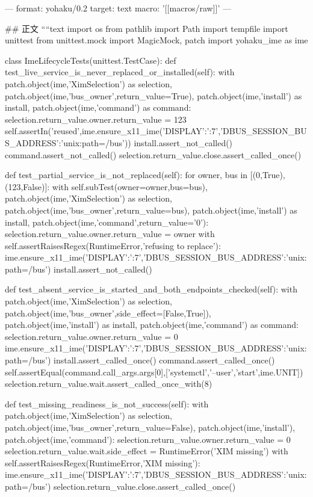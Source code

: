 ---
format: yohaku/0.2
target: text
macro: '[[macros/raw]]'
---

## 正文
````text
import os
from pathlib import Path
import tempfile
import unittest
from unittest.mock import MagicMock, patch
import yohaku_ime as ime


class ImeLifecycleTests(unittest.TestCase):
    def test_live_service_is_never_replaced_or_installed(self):
        with patch.object(ime,'XimSelection') as selection, patch.object(ime,'bus_owner',return_value=True), patch.object(ime,'install') as install, patch.object(ime,'command') as command:
            selection.return_value.owner.return_value = 123
            self.assertIn('reused',ime.ensure_x11_ime({'DISPLAY':':7','DBUS_SESSION_BUS_ADDRESS':'unix:path=/bus'}))
            install.assert_not_called()
            command.assert_not_called()
            selection.return_value.close.assert_called_once()

    def test_partial_service_is_not_replaced(self):
        for owner, bus in [(0,True),(123,False)]:
            with self.subTest(owner=owner,bus=bus), patch.object(ime,'XimSelection') as selection, patch.object(ime,'bus_owner',return_value=bus), patch.object(ime,'install') as install, patch.object(ime,'command',return_value='0'):
                selection.return_value.owner.return_value = owner
                with self.assertRaisesRegex(RuntimeError,'refusing to replace'):
                    ime.ensure_x11_ime({'DISPLAY':':7','DBUS_SESSION_BUS_ADDRESS':'unix:path=/bus'})
                install.assert_not_called()

    def test_absent_service_is_started_and_both_endpoints_checked(self):
        with patch.object(ime,'XimSelection') as selection, patch.object(ime,'bus_owner',side_effect=[False,True]), patch.object(ime,'install') as install, patch.object(ime,'command') as command:
            selection.return_value.owner.return_value = 0
            ime.ensure_x11_ime({'DISPLAY':':7','DBUS_SESSION_BUS_ADDRESS':'unix:path=/bus'})
            install.assert_called_once()
            command.assert_called_once()
            self.assertEqual(command.call_args.args[0],['systemctl','--user','start',ime.UNIT])
            selection.return_value.wait.assert_called_once_with(8)

    def test_missing_readiness_is_not_success(self):
        with patch.object(ime,'XimSelection') as selection, patch.object(ime,'bus_owner',return_value=False), patch.object(ime,'install'), patch.object(ime,'command'):
            selection.return_value.owner.return_value = 0
            selection.return_value.wait.side_effect = RuntimeError('XIM missing')
            with self.assertRaisesRegex(RuntimeError,'XIM missing'):
                ime.ensure_x11_ime({'DISPLAY':':7','DBUS_SESSION_BUS_ADDRESS':'unix:path=/bus'})
            selection.return_value.close.assert_called_once()

